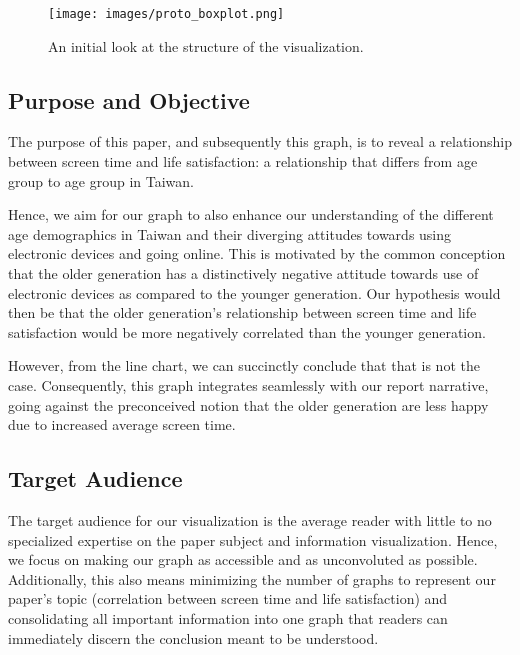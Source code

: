 \documentclass[12pt, a4paper]{article}
\begin{document}
\begin{figure}[!h]
    \centering
    \texttt{[image: images/proto\_boxplot.png]}
    \caption{An initial look at the structure of the visualization.}
\end{figure}

\newpage

\subsection{Purpose and Objective}
\par The purpose of this paper, and subsequently this graph, is to reveal a relationship between screen time and life satisfaction: a relationship that differs from age group to age group in Taiwan.
\par Hence, we aim for our graph to also enhance our understanding of the different age demographics in Taiwan and their diverging attitudes towards using electronic devices and going online. This is motivated by the common conception that the older generation has a distinctively negative attitude towards use of electronic devices as compared to the younger generation. Our hypothesis would then be that the older generation’s relationship between screen time and life satisfaction would be more negatively correlated than the younger generation.
\par However, from the line chart, we can succinctly conclude that that is not the case. Consequently, this graph integrates seamlessly with our report narrative, going against the preconceived notion that the older generation are less happy due to increased average screen time.

\subsection{Target Audience}
\par The target audience for our visualization is the average reader with little to no specialized expertise on the paper subject and information visualization. Hence, we focus on making our graph as accessible and as unconvoluted as possible. Additionally, this also means minimizing the number of graphs to represent our paper’s topic (correlation between screen time and life satisfaction) and consolidating all important information into one graph that readers can immediately discern the conclusion meant to be understood.
\end{document}
